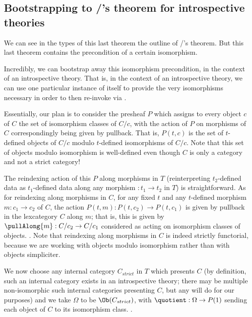 \subsection{Bootstrapping to \Loeb/'s theorem for introspective theories}
We can see in the types of this last theorem the outline of \Loeb/'s theorem. But this last theorem contains the precondition of a certain isomorphism.

Incredibly, we can bootstrap away this isomorphism precondition, in the context of an introspective theory. That is, in the context of an introspective theory, we can use one particular instance of  itself to provide the very isomorphisms necessary in order to then re-invoke  via .

Essentially, our plan is to consider the presheaf $P$ which assigns to every object $c$ of $C$ the set of isomorphism classes of $C/c$, with the action of $P$ on morphisms of $C$ correspondingly being given by pullback. That is, $P(t, c)$ is the set of $t$-defined objects of $C/c$ modulo $t$-defined isomorphisms of $C/c$. Note that this set of objects modulo isomorphism is well-defined even though $C$ is only a category and not a strict category!

The reindexing action of this $P$ along morphisms in $T$ (reinterpreting $t_2$-defined data as $t_1$-defined data along any morphism $: t_1 \to t_2$ in $T$) is straightforward. As for reindexing along morphisms in $C$, for any fixed $t$ and any $t$-defined morphism $m : c_1 \to c_2$ of $C$, the action $P(t, m) : P(t, c_2) \to P(t, c_1)$ is given by pullback in the lexcategory $C$ along $m$; that is, this is given by $\pullAlong{m} : C/c_2 \to C/c_1$ considered as acting on isomorphism classes of objects. . Note that reindexing along morphisms in $C$ is indeed strictly functorial, because we are working with objects modulo isomorphism rather than with objects simpliciter.

We now choose any internal category $C_{strict}$ in $T$ which presents $C$ (by definition, such an internal category exists in an introspective theory; there may be multiple non-isomorphic such internal categories presenting $C$, but any will do for our purposes) and we take $\Omega$ to be $\Ob(C_{strict})$, with $\quotient : \Omega \to P(1)$ sending each object of $C$ to its isomorphism class. . 

